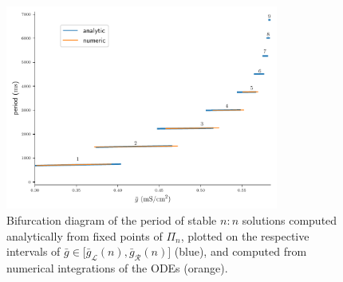 \documentclass[utf8]{frontiersFPHY} %
\begin{document}
\begin{figure}[h!]
	\centering
	\includegraphics[width=0.8\textwidth]{final-bif}
	\caption{Bifurcation diagram of the period of stable $n:n$ solutions computed analytically from fixed points of $\Pi_n$, plotted on the respective intervals of $\bar g\in \big[\bar g_{\mathcal{L}}(n),\bar g_{\mathcal{R}}(n)\big]$ (blue), and computed from numerical integrations of the ODEs (orange).~\label{fig:final-bif}}
\end{figure}
\end{document}

